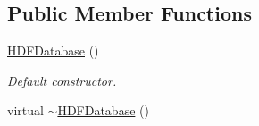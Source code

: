 \subsection*{Public Member Functions}
\begin{DoxyCompactItemize}
\item 
\hypertarget{class_c_a_r_o_m_1_1_h_d_f_database_a99c948a5d96d8b07e66767aff226c3b5}{\hyperlink{class_c_a_r_o_m_1_1_h_d_f_database_a99c948a5d96d8b07e66767aff226c3b5}{H\-D\-F\-Database} ()}\label{class_c_a_r_o_m_1_1_h_d_f_database_a99c948a5d96d8b07e66767aff226c3b5}

\begin{DoxyCompactList}\small\item\em Default constructor. \end{DoxyCompactList}\item 
\hypertarget{class_c_a_r_o_m_1_1_h_d_f_database_a18868c37aa6a37fd6526d56aec2f6f4c}{virtual \hyperlink{class_c_a_r_o_m_1_1_h_d_f_database_a18868c37aa6a37fd6526d56aec2f6f4c}{$\sim$\-H\-D\-F\-Database} ()}\label{class_c_a_r_o_m_1_1_h_d_f_database_a18868c37aa6a37fd6526d56aec2f6f4c}


\end{DoxyCompactItemize}
